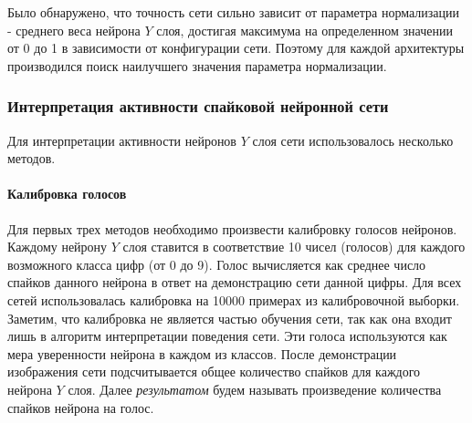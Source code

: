 \documentclass[a4paper]{article}
\begin{document}
Было обнаружено, что точность сети сильно зависит от параметра нормализации - среднего веса нейрона $Y$ слоя, достигая максимума на определенном значении от 0 до 1 в зависимости от конфигурации сети. Поэтому для каждой архитектуры производился поиск наилучшего значения параметра нормализации.

\subsubsection{Интерпретация активности спайковой нейронной сети}
Для интерпретации активности нейронов $Y$ слоя сети использовалось несколько методов.

\paragraph{Калибровка голосов} \label{calibration}
Для первых трех методов необходимо произвести калибровку голосов нейронов. Каждому нейрону $Y$ слоя ставится в соответствие 10 чисел (голосов) для каждого возможного класса цифр (от 0 до 9). Голос вычисляется как среднее число спайков данного нейрона в ответ на демонстрацию сети данной цифры. Для всех сетей использовалась калибровка на 10000 примерах из калибровочной выборки. Заметим, что калибровка не является частью обучения сети, так как она входит лишь в алгоритм интерпретации поведения сети. Эти голоса используются как мера уверенности нейрона в каждом из классов. После демонстрации изображения сети подсчитывается общее количество спайков для каждого нейрона $Y$ слоя. Далее \textit{результатом} будем называть произведение количества спайков нейрона на голос.
\end{document}
